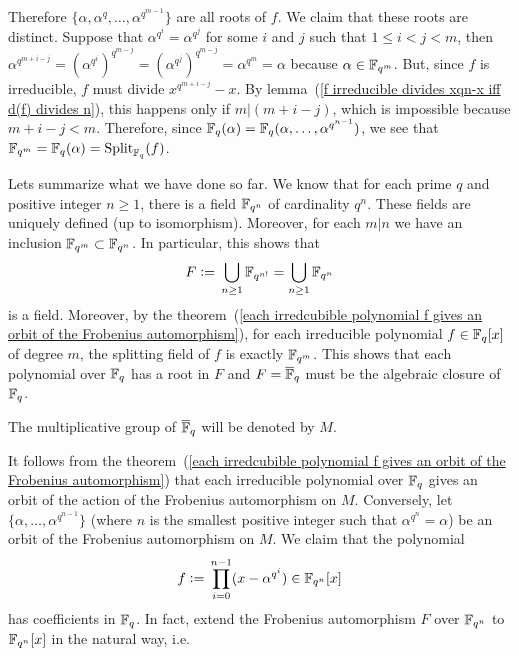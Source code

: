 Therefore $\{\alpha,\alpha^q,\dots,\alpha^{q^{m-1}}\}$ are all roots of $f$. We claim that these roots are distinct. Suppose that $\alpha^{q^i}=\alpha^{q^j}$ for some $i$ and $j$ such that $1\leq i<j<m$, then $\alpha^{q^{m+i-j}}=(\alpha^{q^i})^{q^{m-j}}=(\alpha^{q^j})^{q^{m-j}}=\alpha^{q^m}=\alpha$ because $\alpha\in\mathbb{F}_{q^m}$. But, since $f$ is irreducible, $f$ must divide $x^{q^{m+i-j}}-x$. By lemma~(\ref{f irreducible divides xqn-x iff d(f) divides n}), this happens only if $m|(m+i-j)$, which is impossible because $m+i-j<m$. Therefore, since $\mathbb{F}_q(\alpha)=\mathbb{F}_q(\alpha,\dots,\alpha^{q^{n-1}})$, we see that $\mathbb{F}_{q^m}=\mathbb{F}_q(\alpha)=\text{Split}_{\mathbb{F}_q}(f)$.\par
Lets summarize what we have done so far. We know that for each prime $q$ and positive integer $n\geq1$, there is a field $\mathbb{F}_{q^n}$ of cardinality $q^n$. These fields are uniquely defined (up to isomorphism). Moreover, for each $m|n$ we have an inclusion $\mathbb{F}_{q^m}\subset \mathbb{F}_{q^n}$. In particular, this shows that 
\begin{equation}
    F\bydef \bigcup_{n\geq1}\bb{F}_{q^{n!}}=\bigcup_{n\geq1}\bb{F}_{q^{n}}
\end{equation}
is a field. Moreover, by the theorem~(\ref{each irredcubible polynomial f gives an orbit of the Frobenius automorphism}), for each irreducible polynomial $f\in\mathbb{F}_q[x]$ of degree $m$, the splitting field of $f$ is exactly $\mathbb{F}_{q^m}$. This shows that each polynomial over $\mathbb{F}_q$ has a root in $F$ and $F=\overline{\mathbb{F}}_q$ must be the algebraic closure of $\mathbb{F}_q$.
\begin{dang}
    \begin{notation}
        The multiplicative group of $\overline{\mathbb{F}}_q$ will be denoted by $M$.
    \end{notation}
\end{dang}
It follows from the theorem~(\ref{each irredcubible polynomial f gives an orbit of the Frobenius automorphism}) that each irreducible polynomial over $\mathbb{F}_q$ gives an orbit of the action of the Frobenius automorphism on $M$. Conversely, let $\{\alpha,\dots,\alpha^{q^{n-1}}\}$ (where $n$ is the smallest positive integer such that $\alpha^{q^n}=\alpha$) be an orbit of the Frobenius automorphism on $M$. We claim that the polynomial 
\begin{equation}
    f\bydef\prod_{i=0}^{n-1}(x-\alpha^{q^i})\in\bb{F}_{q^n}[x]
\end{equation}
has coefficients in $\mathbb{F}_q$. In fact, extend the Frobenius automorphism $F$ over $\mathbb{F}_{q^n}$ to $\mathbb{F}_{q^n}[x]$ in the natural way, i.e.
